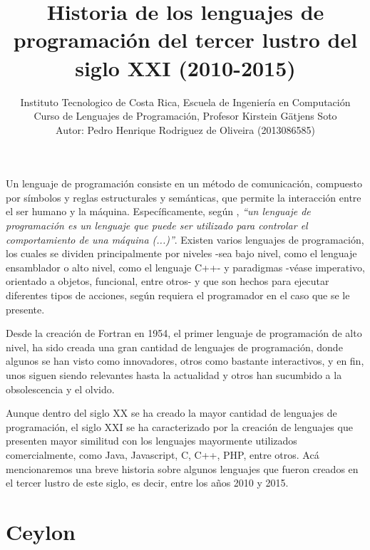 \documentclass[a4paper,11pt]{article}
\begin{document}
\title{Historia de los lenguajes de programación del tercer lustro del siglo XXI (2010-2015) \\
}
\date{} %
\author{Instituto Tecnologico de Costa Rica, Escuela de Ingeniería en Computación\\
Curso de Lenguajes de Programación, Profesor Kirstein Gätjens Soto\\
Autor: Pedro Henrique Rodriguez de Oliveira (2013086585)}

\maketitle
Un lenguaje de programación consiste en un método de comunicación, compuesto por símbolos y reglas estructurales y semánticas, que permite la interacción entre el ser humano y la máquina. Específicamente, según \cite{Saavedra}, \textsl{“un lenguaje de programación es un lenguaje que puede ser utilizado para controlar el comportamiento de una máquina (...)”}. Existen varios lenguajes de programación, los cuales se dividen principalmente por niveles -sea bajo nivel, como el lenguaje ensamblador o alto nivel, como el lenguaje C++- y paradigmas -véase imperativo, orientado a objetos, funcional, entre otros- y que son hechos para ejecutar diferentes tipos de acciones, según requiera el programador en el caso que se le presente.

Desde la creación de Fortran en 1954, el primer lenguaje de programación de alto nivel, ha sido creada una gran cantidad de lenguajes de programación, donde algunos se han visto como innovadores, otros como bastante interactivos, y en fin, unos siguen siendo relevantes hasta la actualidad y otros han sucumbido a la obsolescencia y el olvido.

Aunque dentro del siglo XX se ha creado la mayor cantidad de lenguajes de programación, el siglo XXI se ha caracterizado por la creación de lenguajes que presenten mayor similitud con los lenguajes mayormente utilizados comercialmente, como Java, Javascript, C, C++, PHP, entre otros. Acá mencionaremos una breve historia sobre algunos lenguajes que fueron creados en el tercer lustro de este siglo, es decir, entre los años 2010 y 2015.

\section{Ceylon}
\end{document}
